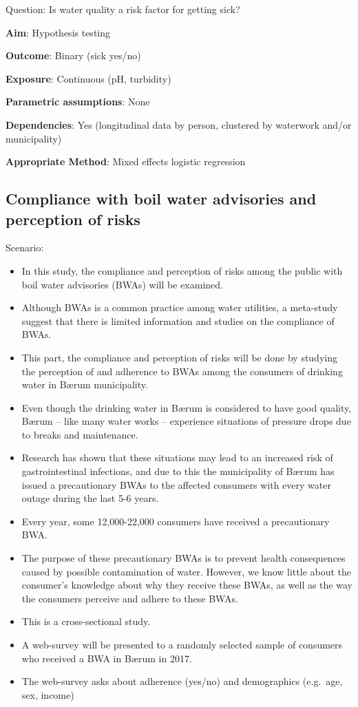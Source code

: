 \documentclass[12pt,]{article}
\providecommand{\tightlist}{%
  \setlength{\itemsep}{0pt}\setlength{\parskip}{0pt}}
\begin{document}
Question: Is water quality a risk factor for getting sick?

\textbf{Aim}: Hypothesis testing

\textbf{Outcome}: Binary (sick yes/no)

\textbf{Exposure}: Continuous (pH, turbidity)

\textbf{Parametric assumptions}: None

\textbf{Dependencies}: Yes (longitudinal data by person, clustered by
waterwork and/or municipality)

\textbf{Appropriate Method}: Mixed effects logistic regression

\subsection{Compliance with boil water advisories and perception of
risks}\label{compliance-with-boil-water-advisories-and-perception-of-risks-1}

Scenario:

\begin{itemize}
\tightlist
\item
  In this study, the compliance and perception of risks among the public
  with boil water advisories (BWAs) will be examined.
\item
  Although BWAs is a common practice among water utilities, a meta-study
  suggest that there is limited information and studies on the
  compliance of BWAs.
\item
  This part, the compliance and perception of risks will be done by
  studying the perception of and adherence to BWAs among the consumers
  of drinking water in Bærum municipality.
\item
  Even though the drinking water in Bærum is considered to have good
  quality, Bærum -- like many water works -- experience situations of
  pressure drops due to breaks and maintenance.
\item
  Research has shown that these situations may lead to an increased risk
  of gastrointestinal infections, and due to this the municipality of
  Bærum has issued a precautionary BWAs to the affected consumers with
  every water outage during the last 5-6 years.
\item
  Every year, some 12,000-22,000 consumers have received a precautionary
  BWA.
\item
  The purpose of these precautionary BWAs is to prevent health
  consequences caused by possible contamination of water. However, we
  know little about the consumer's knowledge about why they receive
  these BWAs, as well as the way the consumers perceive and adhere to
  these BWAs.
\item
  This is a cross-sectional study.
\item
  A web-survey will be presented to a randomly selected sample of
  consumers who received a BWA in Bærum in 2017.
\item
  The web-survey asks about adherence (yes/no) and demographics
  (e.g.~age, sex, income)
\end{itemize}
\end{document}
